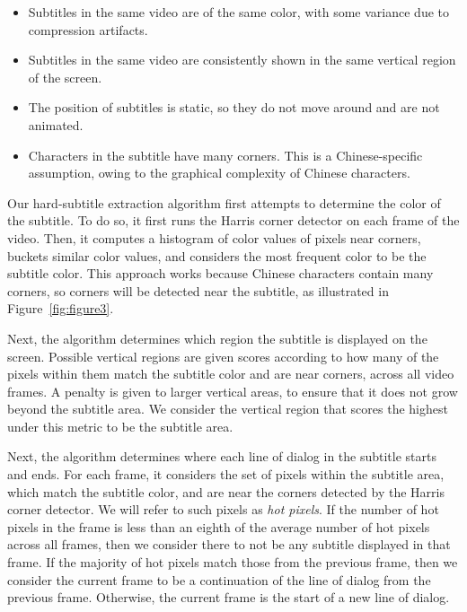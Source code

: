 \documentclass{sigchi}
\begin{document}
\begin{itemize}[noitemsep]
\item Subtitles in the same video are of the same color, with some variance due to compression artifacts.
\item Subtitles in the same video are consistently shown in the same vertical region of the screen.
\item The position of subtitles is static, so they do not move around and are not animated.
\item Characters in the subtitle have many corners. This is a Chinese-specific assumption, owing to the graphical complexity of Chinese characters.
\end{itemize}

Our hard-subtitle extraction algorithm first attempts to determine the color
of the subtitle. To do so, it first runs the Harris corner detector \cite{harris1988combined}
on each frame of the video. Then, it computes a histogram of color values of pixels near corners, buckets similar color values, and considers the most frequent color to be the subtitle color. This approach works because Chinese characters contain many corners,
so corners will be detected near the subtitle, as illustrated
in Figure~\ref{fig:figure3}.

Next, the algorithm determines which region the subtitle is displayed on the screen. Possible vertical regions are given scores according to how many of the pixels within them match the subtitle color and are
near corners, across all video frames. A penalty is given to larger vertical
areas, to ensure that it does not grow beyond the subtitle area. We consider the vertical region
that scores the highest under this metric to be the subtitle area.

Next, the algorithm determines where each line of dialog in the subtitle
starts and ends. For each frame, it considers the set of pixels within the subtitle area,
which match the subtitle color, and are near the corners detected by the Harris corner detector. We will refer to such pixels as \emph{hot pixels}. If the number of hot pixels in the frame is less than
an eighth of the average number of hot pixels across all frames,
then we consider there to not be any subtitle displayed in that frame.
If the majority of hot pixels match those from the previous frame, then
we consider the current frame to be a continuation of the line of dialog from the previous frame.
Otherwise, the current frame is the start of a new line of dialog.
\end{document}
